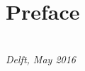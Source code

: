 \chapter*{Preface}




\begin{flushright}
{\makeatletter\itshape
    \@author\\
    Delft, May 2016
\makeatother}
\end{flushright}

